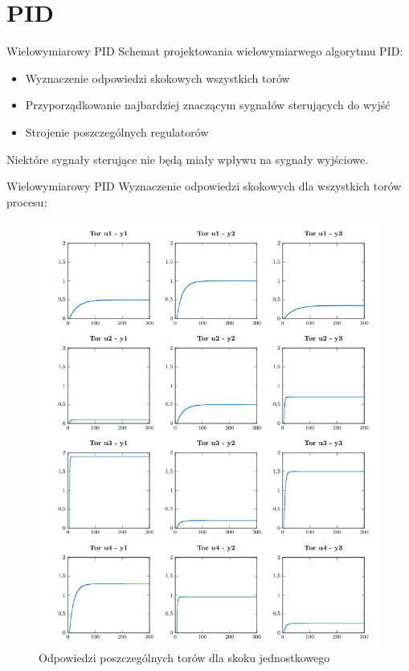 \section{PID}

\begin{frame}{Wielowymiarowy PID}
Schemat projektowania wielowymiarwego algorytmu PID:
\begin{itemize}
    \item Wyznaczenie odpowiedzi skokowych wszystkich torów
    \item Przyporządkowanie najbardziej znaczącym sygnałów sterujących do wyjść
    \item Strojenie poszczególnych regulatorów
\end{itemize}
Niektóre sygnały sterujące nie będą miały wpływu na sygnały wyjściowe. 
\end{frame}


\begin{frame}{Wielowymiarowy PID}
Wyznaczenie odpowiedzi skokowych dla wszystkich torów procesu:
	\begin{center}
		\begin{figure}[H]
            		\includegraphics[scale=0.25]{images/PIDtory.png}
          			 \caption{Odpowiedzi poszczególnych torów dla skoku jednostkowego}
		\end{figure}
	\end{center}
\end{frame}

